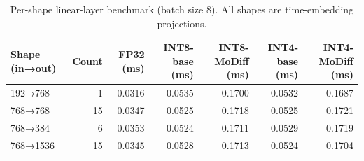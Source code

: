 \begin{table}
    [htbp]
    \centering
    \small
    \caption{Per-shape linear-layer benchmark (batch size 8). All shapes are time-embedding projections.}
    \label{tab:linear_layer}
    \begin{tabular}{lrrrrrr}
        \toprule Shape (in→out) & Count & FP32 (ms) & INT8-base (ms) & INT8-MoDiff (ms) & INT4-base (ms) & INT4-MoDiff (ms) \\
        \midrule 192→768        & 1     & 0.0316    & 0.0535         & 0.1700           & 0.0532         & 0.1687           \\
        768→768                 & 15    & 0.0347    & 0.0525         & 0.1718           & 0.0525         & 0.1721           \\
        768→384                 & 6     & 0.0353    & 0.0524         & 0.1711           & 0.0529         & 0.1719           \\
        768→1536                & 15    & 0.0345    & 0.0528         & 0.1713           & 0.0524         & 0.1704           \\
        \bottomrule
    \end{tabular}
\end{table}